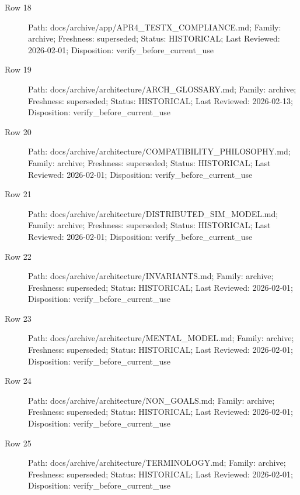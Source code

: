 \documentclass[10.5pt,a4paper,openany]{book}
\begin{document}
\begin{description}
\item[Row 18] Path: docs/\allowbreak{}archive/\allowbreak{}app/\allowbreak{}APR4\_\allowbreak{}TESTX\_\allowbreak{}COMPLIANCE.\allowbreak{}md; Family: archive; Freshness: superseded; Status: HISTORICAL; Last Reviewed: 2026-\allowbreak{}02-\allowbreak{}01; Disposition: verify\_\allowbreak{}before\_\allowbreak{}current\_\allowbreak{}use
\item[Row 19] Path: docs/\allowbreak{}archive/\allowbreak{}architecture/\allowbreak{}ARCH\_\allowbreak{}GLOSSARY.\allowbreak{}md; Family: archive; Freshness: superseded; Status: HISTORICAL; Last Reviewed: 2026-\allowbreak{}02-\allowbreak{}13; Disposition: verify\_\allowbreak{}before\_\allowbreak{}current\_\allowbreak{}use
\item[Row 20] Path: docs/\allowbreak{}archive/\allowbreak{}architecture/\allowbreak{}COMPATIBILITY\_\allowbreak{}PHILOSOPHY.\allowbreak{}md; Family: archive; Freshness: superseded; Status: HISTORICAL; Last Reviewed: 2026-\allowbreak{}02-\allowbreak{}01; Disposition: verify\_\allowbreak{}before\_\allowbreak{}current\_\allowbreak{}use
\item[Row 21] Path: docs/\allowbreak{}archive/\allowbreak{}architecture/\allowbreak{}DISTRIBUTED\_\allowbreak{}SIM\_\allowbreak{}MODEL.\allowbreak{}md; Family: archive; Freshness: superseded; Status: HISTORICAL; Last Reviewed: 2026-\allowbreak{}02-\allowbreak{}01; Disposition: verify\_\allowbreak{}before\_\allowbreak{}current\_\allowbreak{}use
\item[Row 22] Path: docs/\allowbreak{}archive/\allowbreak{}architecture/\allowbreak{}INVARIANTS.\allowbreak{}md; Family: archive; Freshness: superseded; Status: HISTORICAL; Last Reviewed: 2026-\allowbreak{}02-\allowbreak{}01; Disposition: verify\_\allowbreak{}before\_\allowbreak{}current\_\allowbreak{}use
\item[Row 23] Path: docs/\allowbreak{}archive/\allowbreak{}architecture/\allowbreak{}MENTAL\_\allowbreak{}MODEL.\allowbreak{}md; Family: archive; Freshness: superseded; Status: HISTORICAL; Last Reviewed: 2026-\allowbreak{}02-\allowbreak{}01; Disposition: verify\_\allowbreak{}before\_\allowbreak{}current\_\allowbreak{}use
\item[Row 24] Path: docs/\allowbreak{}archive/\allowbreak{}architecture/\allowbreak{}NON\_\allowbreak{}GOALS.\allowbreak{}md; Family: archive; Freshness: superseded; Status: HISTORICAL; Last Reviewed: 2026-\allowbreak{}02-\allowbreak{}01; Disposition: verify\_\allowbreak{}before\_\allowbreak{}current\_\allowbreak{}use
\item[Row 25] Path: docs/\allowbreak{}archive/\allowbreak{}architecture/\allowbreak{}TERMINOLOGY.\allowbreak{}md; Family: archive; Freshness: superseded; Status: HISTORICAL; Last Reviewed: 2026-\allowbreak{}02-\allowbreak{}01; Disposition: verify\_\allowbreak{}before\_\allowbreak{}current\_\allowbreak{}use

\end{description}
\end{document}
